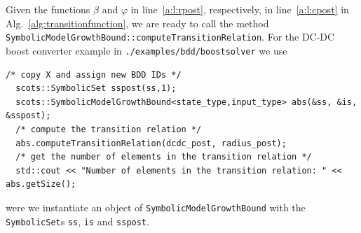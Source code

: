 \documentclass[a4paper]{amsart}
\begin{document}
Given the functions $\beta$ and $\varphi$ in line~\ref{a:l:rpost}, respectively, in
line~\ref{a:l:cpost} in Alg.~\ref{alg:transitionfunction}, we are ready to call
the method {\tt\small
SymbolicModelGrowthBound::computeTransitionRelation}. For the DC-DC boost converter
example in {\tt\small ./examples/bdd/boostsolver} we use
\begin{lstlisting}[basicstyle=\footnotesize\ttfamily]
  /* copy X and assign new BDD IDs */                                                                                                                                                                                                                                                                                                                           
  scots::SymbolicSet sspost(ss,1);
  scots::SymbolicModelGrowthBound<state_type,input_type> abs(&ss, &is, &sspost);
  /* compute the transition relation */
  abs.computeTransitionRelation(dcdc_post, radius_post);
  /* get the number of elements in the transition relation */
  std::cout << "Number of elements in the transition relation: " << abs.getSize();
\end{lstlisting}
were we instantiate an object of {\tt\small SymbolicModelGrowthBound} with the
{\tt\small SymbolicSet}s {\tt \small ss}, {\tt\small is} and  {\tt\small sspost}.
\end{document}
